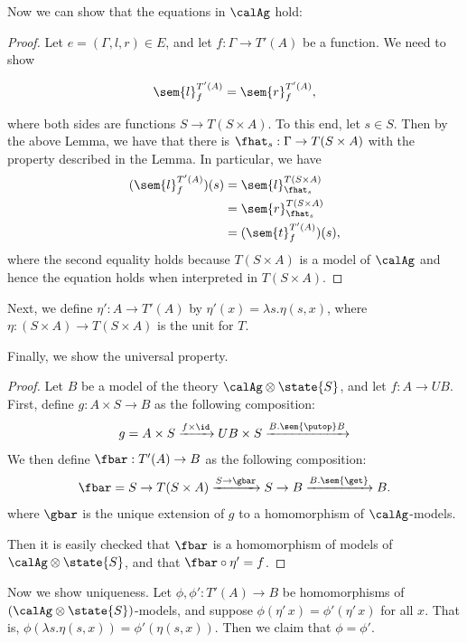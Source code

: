 Now we can show that the equations in $\calAg$ hold:
\begin{proof}
    Let $e = (\Gamma, l, r) \in
    E$, and let $f : \Gamma \to T'(A)$ be a function. We need to show

    \[ \sem{l}_f^{T'(A)} = \sem{r}_f^{T'(A)}, \]

    where both sides are functions $S \to T(S \times A)$. To this end, let $s \in
    S$. Then by the above Lemma, we have that there is $\fhat_s : \Gamma \to T(S \times
    A)$ with the property described in the Lemma. In particular, we have
    \begin{align*}
        (\sem{l}_f^{T'(A)})(s) 
        &= \sem{l}_{\fhat_s}^{T(S \times A)} \\
        &= \sem{r}_{\fhat_s}^{T(S \times A)} \\
        &= (\sem{t}_f^{T'(A)})(s),
    \end{align*}
    where the second equality holds because $T(S \times A)$ is a model of $\calAg$
    and hence the equation holds when interpreted in $T(S \times A)$.
\end{proof}

Next, we define $\eta' : A \to T'(A)$ by 
%
$\eta'(x) = \lambda s.\eta(s, x)$, 
%
where $\eta : (S \times A) \to T(S \times A)$ is the unit for $T$.

Finally, we show the universal property.
\begin{proof}
    Let $B$ be a model of the theory $\calAg \otimes \state{S}$, and let $f : A \to UB$.
    First, define $g : A \times S \to B$ as the following composition:
    \[ g = A \times S \xrightarrow{f \times \id} UB \times S \xrightarrow{B.\sem{\putop} B} \]
    We then define $\fbar : T'(A) \to B$ as the following composition:
    \[ \fbar = 
        S \to T(S \times A) \xrightarrow{S \to \gbar} S \to B \xrightarrow{B.\sem{\get}} B.  \]
    where $\gbar$ is the unique extension of $g$ to a homomorphism of $\calAg$-models.


    Then it is easily checked that $\fbar$ is a homomorphism of models of $\calAg
    \otimes {\state{S}}$, and that $\fbar \circ \eta' = f$.
\end{proof}

Now we show uniqueness. Let $\phi, \phi' : T'(A) \to B$ be homomorphisms of
$(\calAg \otimes {\state{S}})$-models, and suppose $\phi(\eta'\, x) =
\phi'(\eta'\, x)$ for all $x$. That is, $\phi(\lambda s. \eta(s,x)) =
\phi'(\eta(s,x))$. Then we claim that $\phi = \phi'$.

